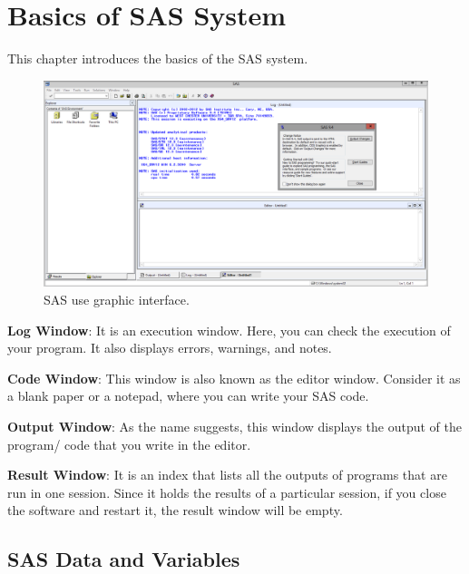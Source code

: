 \documentclass[
]{book}
\begin{document}
\hypertarget{basics-of-sas-system}{%
\chapter{Basics of SAS System}\label{basics-of-sas-system}}

This chapter introduces the basics of the SAS system.

\begin{figure}

{\centering \includegraphics[width=1\linewidth]{img01/w01-SASUI} 

}

\caption{SAS use graphic interface.}\label{fig:unnamed-chunk-3}
\end{figure}

\textbf{Log Window}: It is an execution window. Here, you can check the execution of your program. It also displays errors, warnings, and notes.

\textbf{Code Window}: This window is also known as the editor window. Consider it as a blank paper or a notepad, where you can write your SAS code.

\textbf{Output Window}: As the name suggests, this window displays the output of the program/ code that you write in the editor.

\textbf{Result Window}: It is an index that lists all the outputs of programs that are run in one session. Since it holds the results of a particular session, if you close the software and restart it, the result window will be empty.

\hypertarget{sas-data-and-variables}{%
\section{SAS Data and Variables}\label{sas-data-and-variables}}
\end{document}
